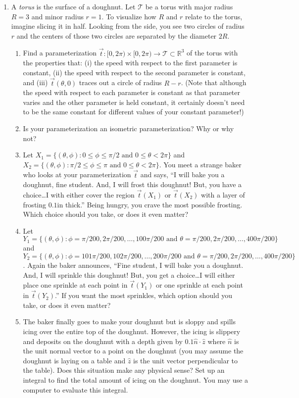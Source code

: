 \documentclass[letter]{article}
\newcommand{\R}{\mathbb{R}}
\begin{document}
\begin{enumerate}
		\item A \emph{torus} is the surface of a doughnut.  Let $\mathcal T$ be a torus with 
			major radius $R=3$ and minor radius $r=1$.  To visualize how $R$ and $r$
			relate to the torus, imagine slicing it in half.  Looking from the side,
			you see two circles of radius $r$ and the centers of those two circles
			are separated by the diameter $2R$.
		\begin{enumerate}
			\item Find a parameterization $\vec t:[0,2\pi)\times [0,2\pi)\to \mathcal T\subset \R^3$
				of the torus with the properties that: (i) the speed with respect to
				the first parameter is constant, (ii) the speed with respect to the second
				parameter is constant, and (iii) $\vec t(\theta, 0)$ traces out a circle
				of radius $R-r$.  (Note that although the speed with respect to
				each parameter is constant as that parameter varies and the other parameter
				is held constant, it certainly
				doesn't need to be the same constant for different values of your constant parameter!)
			\item Is your parameterization an isometric parameterization?  Why or why not?
			\item Let $X_1 =\{(\theta, \phi): 0\leq \phi\leq \pi/2\text{ and }0\leq \theta < 2\pi\}$
				and $X_2 =\{(\theta, \phi): \pi/2\leq \phi\leq \pi\text{ and }0\leq \theta < 2\pi\}$.
					You meet a strange baker who looks at your parameterization $\vec t$ and says,
				``I will bake you a doughnut, fine student.  And, I will frost this doughnut!
				But, you have a choice\ldots{}I with either cover the region $\vec t(X_1)$ or
				$\vec t(X_2)$ with a layer of frosting $0.1$in thick.''  Being hungry, you crave
				the most possible frosting.  Which choice should you take, or does it even matter?
			\item Let $Y_1 =\{(\theta, \phi): \phi=\pi/200,2\pi/200,\ldots, 100\pi/200\text{ and }\theta
				=\pi/200,2\pi/200,\ldots, 400\pi/200\}$ and 
				$Y_2 =\{(\theta, \phi): \phi=101\pi/200,102\pi/200,\ldots,200\pi/200\text{ and }\theta
				=\pi/200,2\pi/200,\ldots, 400\pi/200\}$.
				Again the baker announces, ``Fine student, I will bake you a doughnut.  And, I will
				sprinkle this doughnut! But, you get a choice\ldots{}I will either place
				one sprinkle at each point in $\vec t(Y_1)$ or one sprinkle at each point in 
				$\vec t(Y_2)$.''  If you want the most sprinkles, which option should you take, or
				does it even matter?
			\item The baker finally goes to make your doughnut but is sloppy and spills icing
				over the entire top of the doughnut.  However, the icing is slippery and
				deposits on the doughnut with a depth given by $0.1\hat n\cdot \hat z$ where
				$\hat n$ is the unit normal vector to a point on the doughnut (you may assume the doughnut
				is laying on a table and $\hat z$ is the unit vector perpendicular to the
				table).  Does this situation make any physical sense?  Set up an integral to
				find the total amount of icing on the doughnut.  You may use a computer
				to evaluate this integral.
		\end{enumerate}


\end{enumerate}
\end{document}
